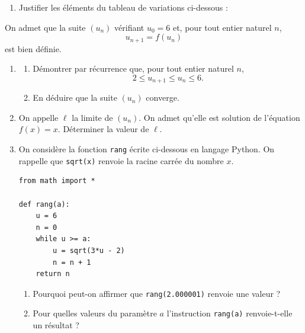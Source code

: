 \documentclass[11pt,a4paper]{article}
\begin{document}
\begin{enumerate}
  \item Justifier les éléments du tableau de variations ci-dessous :
  \begin{center}
  \end{center}
\end{enumerate}

On admet que la suite $(u_n)$ vérifiant $u_0=6$ et, pour tout entier naturel $n$,
\[
u_{n+1}=f(u_n)
\]
est bien définie.

\begin{enumerate}[resume]
  \item
  \begin{enumerate}
    \item Démontrer par récurrence que, pour tout entier naturel $n$,
    \[
    2\leqslant u_{n+1}\leqslant u_n\leqslant 6.
    \]
    \item En déduire que la suite $(u_n)$ converge.
  \end{enumerate}
  \item On appelle $\ell$ la limite de $(u_n)$. On admet qu'elle est solution de l'équation $f(x)=x$. Déterminer la valeur de $\ell$.
  \item On considère la fonction \texttt{rang} écrite ci-dessous en langage Python. On rappelle que \texttt{sqrt(x)} renvoie la racine carrée du nombre $x$.
\begin{Verbatim}[frame=single, fontsize=\small]
from math import *

def rang(a):
    u = 6
    n = 0
    while u >= a:
        u = sqrt(3*u - 2)
        n = n + 1
    return n
\end{Verbatim}
  \begin{enumerate}
    \item Pourquoi peut-on affirmer que \texttt{rang(2.000001)} renvoie une valeur ?
    \item Pour quelles valeurs du paramètre $a$ l'instruction \texttt{rang(a)} renvoie-t-elle un résultat ?
  \end{enumerate}
\end{enumerate}
\end{document}
